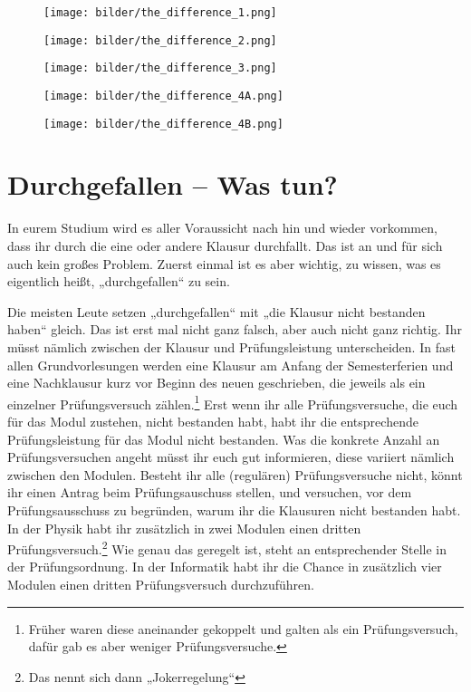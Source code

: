 
\begin{figure*}[t]
    \centering
    \begin{subfigure}[b]{.18\textwidth}
    \texttt{[image: bilder/the\_difference\_1.png]}
    \end{subfigure}
    \begin{subfigure}[b]{.18\textwidth}
    \texttt{[image: bilder/the\_difference\_2.png]}
    \end{subfigure}
    \begin{subfigure}[b]{.18\textwidth}
    \texttt{[image: bilder/the\_difference\_3.png]}
    \end{subfigure}
    \begin{subfigure}[b]{.18\textwidth}
    \texttt{[image: bilder/the\_difference\_4A.png]}
    \end{subfigure}
    \begin{subfigure}[b]{.18\textwidth}
    \texttt{[image: bilder/the\_difference\_4B.png]}
    \end{subfigure}
\end{figure*}

\section{Durchgefallen -- Was tun?}

In eurem Studium wird es aller Voraussicht nach hin und wieder vorkommen, dass ihr durch die eine oder andere Klausur durchfallt. Das ist an und für sich auch kein großes Problem. Zuerst einmal ist es aber wichtig, zu wissen, was es eigentlich heißt, „durchgefallen“ zu sein.

Die meisten Leute setzen „durchgefallen“ mit „die Klausur nicht bestanden haben“ gleich. Das ist erst mal nicht ganz falsch, aber auch nicht ganz richtig. Ihr müsst nämlich zwischen der Klausur und Prüfungsleistung unterscheiden. In fast allen Grundvorlesungen werden eine Klausur am Anfang der Semesterferien und eine Nachklausur kurz vor Beginn des neuen geschrieben, die jeweils als ein einzelner Prüfungsversuch zählen.\footnote{Früher waren diese aneinander gekoppelt und galten als ein Prüfungsversuch, dafür gab es aber weniger Prüfungsversuche.}
Erst wenn ihr alle Prüfungsversuche, die euch für das Modul zustehen, nicht bestanden habt, habt ihr die entsprechende Prüfungsleistung für das Modul nicht bestanden. Was die konkrete Anzahl an Prüfungsversuchen angeht müsst ihr euch gut informieren, diese variiert nämlich zwischen den Modulen. Besteht ihr alle (regulären) Prüfungsversuche nicht, könnt ihr einen Antrag beim Prüfungsauschuss stellen, und versuchen, vor dem Prüfungsausschuss zu begründen, warum ihr die Klausuren nicht bestanden habt. In der Physik habt ihr zusätzlich in zwei Modulen einen dritten Prüfungsversuch.\footnote{Das nennt sich dann „Jokerregelung“} Wie genau das geregelt ist, steht an entsprechender Stelle in der Prüfungsordnung. In der Informatik habt ihr die Chance in zusätzlich vier Modulen einen dritten Prüfungsversuch durchzuführen.

